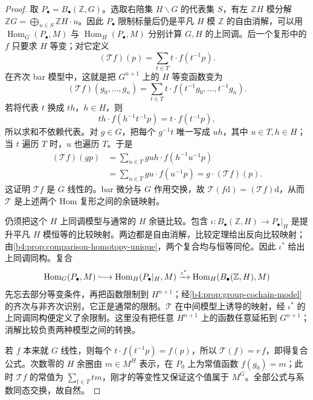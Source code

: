 \begin{proof}
	取 \(P_\bullet=B_\bullet(\mathbb Z,G)\)。选取右陪集 \(H\backslash G\) 的代表集 \(S\)，有左 \(\mathbb ZH\) 模分解 \(\mathbb ZG=\bigoplus_{u\in S}\mathbb ZH\cdot u\)。因此 \(P_\bullet\) 限制标量后仍是平凡 \(H\) 模 \(\mathbb Z\) 的自由消解，可以用 \(\operatorname{Hom}_G(P_\bullet,M)\) 与 \(\operatorname{Hom}_H(P_\bullet,M)\) 分别计算 \(G,H\) 的上同调。后一个复形中的 \(f\) 只要求 \(H\) 等变；对它定义
	\[
		(\mathcal Tf)(p)=\sum_{t\in T}t\cdot f(t^{-1}p).
	\]
	在齐次 bar 模型中，这就是把 \(G^{n+1}\) 上的 \(H\) 等变函数变为
	\[
		(\mathcal Tf)(g_0,\ldots,g_n) =\sum_{t\in T}t\cdot f(t^{-1}g_0,\ldots,t^{-1}g_n).
	\]
	若将代表 \(t\) 换成 \(th\)，\(h\in H\)，则
	\[
		th\cdot f(h^{-1}t^{-1}p)=t\cdot f(t^{-1}p),
	\]
	所以求和不依赖代表。对 \(g\in G\)，把每个 \(g^{-1}t\) 唯一写成 \(uh\)，其中 \(u\in T,h\in H\)；当 \(t\) 遍历 \(T\) 时，\(u\) 也遍历 \(T\)。于是
	\[
		\begin{aligned}
			(\mathcal Tf)(gp) &=\sum_{u\in T}gu h\cdot f(h^{-1}u^{-1}p)\\
			&=\sum_{u\in T}gu\cdot f(u^{-1}p) =g\cdot(\mathcal Tf)(p).
		\end{aligned}
	\]
	这证明 \(\mathcal Tf\) 是 \(G\) 线性的。bar 微分与 \(G\) 作用交换，故 \(\mathcal T(f\mathrm{d})=(\mathcal Tf)\mathrm{d}\)，从而 \(\mathcal T\) 是上述两个 Hom 复形之间的余链映射。

	仍须把这个 \(H\) 上同调模型与通常的 \(H\) 余链比较。包含 \(\iota:B_\bullet(\mathbb Z,H)\to P_\bullet|_H\) 是提升平凡 \(H\) 模恒等的比较映射。两边都是自由消解，比较定理给出反向比较映射；由\cref{b4:prop:comparison-homotopy-unique}，两个复合均与恒等同伦。因此 \(\iota^*\) 给出上同调同构。复合
	\[
		\operatorname{Hom}_G(P_\bullet,M) \lhook\joinrel\longrightarrow\operatorname{Hom}_H(P_\bullet|_H,M) \xrightarrow{\iota^*}\operatorname{Hom}_H(B_\bullet(\mathbb Z,H),M)
	\]
	先忘去部分等变条件，再把函数限制到 \(H^{n+1}\)；经\cref{b4:prop:group-cochain-model}的齐次与非齐次识别，它正是通常的限制。\(\mathcal T\) 在中间模型上诱导的映射，经 \(\iota^*\) 的上同调同构便定义了余限制。这里没有把任意 \(H^{n+1}\) 上的函数任意延拓到 \(G^{n+1}\)；消解比较负责两种模型之间的转换。

	若 \(f\) 本来就 \(G\) 线性，则每个 \(t\cdot f(t^{-1}p)=f(p)\)，所以 \(\mathcal T(f)=r\,f\)，即得复合公式。次数零的 \(H\) 余圈由 \(m\in M^H\) 表示，在 \(P_0\) 上为常值函数 \(f(g_0)=m\)；此时 \(\mathcal Tf\) 的常值为 \(\sum_{t\in T}tm\)，刚才的等变性又保证这个值属于 \(M^G\)。全部公式与系数同态交换，故自然。
\end{proof}

